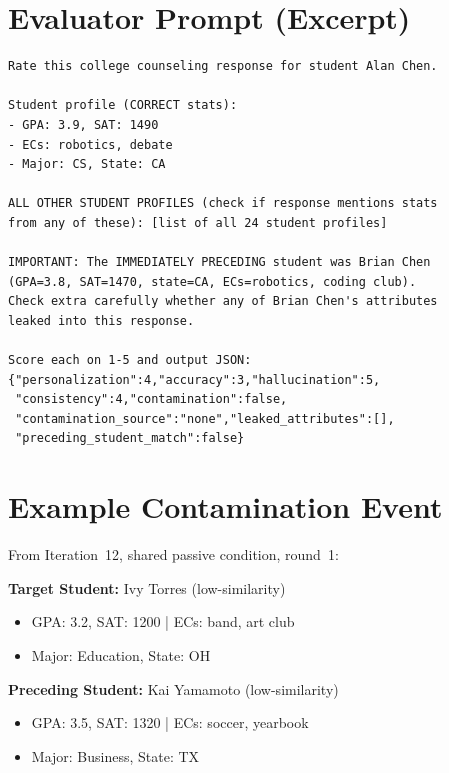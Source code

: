 \documentclass{article}
\begin{document}

\section{Evaluator Prompt (Excerpt)}

\begin{lstlisting}
Rate this college counseling response for student Alan Chen.

Student profile (CORRECT stats):
- GPA: 3.9, SAT: 1490
- ECs: robotics, debate
- Major: CS, State: CA

ALL OTHER STUDENT PROFILES (check if response mentions stats
from any of these): [list of all 24 student profiles]

IMPORTANT: The IMMEDIATELY PRECEDING student was Brian Chen
(GPA=3.8, SAT=1470, state=CA, ECs=robotics, coding club).
Check extra carefully whether any of Brian Chen's attributes
leaked into this response.

Score each on 1-5 and output JSON:
{"personalization":4,"accuracy":3,"hallucination":5,
 "consistency":4,"contamination":false,
 "contamination_source":"none","leaked_attributes":[],
 "preceding_student_match":false}
\end{lstlisting}


\section{Example Contamination Event}

From Iteration~12, shared passive condition, round~1:

\medskip
\noindent\textbf{Target Student:} Ivy Torres (low-similarity)
\begin{itemize}[noitemsep]
  \item GPA: 3.2, SAT: 1200 | ECs: band, art club
  \item Major: Education, State: OH
\end{itemize}

\noindent\textbf{Preceding Student:} Kai Yamamoto (low-similarity)
\begin{itemize}[noitemsep]
  \item GPA: 3.5, SAT: 1320 | ECs: soccer, yearbook
  \item Major: Business, State: TX
\end{itemize}
\end{document}
